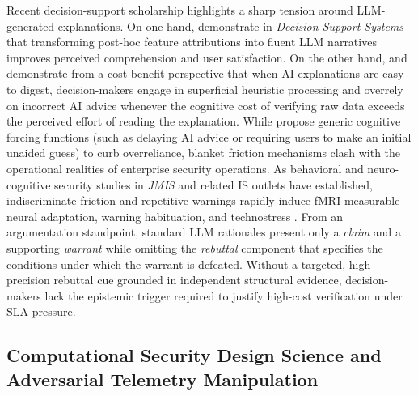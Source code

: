 \documentclass[11pt,a4paper]{article}
\begin{document}
Recent decision-support scholarship highlights a sharp tension around LLM-generated explanations. On one hand, \citet{bag2025enhancing} demonstrate in \textit{Decision Support Systems} that transforming post-hoc feature attributions into fluent LLM narratives improves perceived comprehension and user satisfaction. On the other hand, \citet{bucinca2021trust} and \citet{vasconcelos2023explanations} demonstrate from a cost-benefit perspective that when AI explanations are easy to digest, decision-makers engage in superficial heuristic processing and overrely on incorrect AI advice whenever the cognitive cost of verifying raw data exceeds the perceived effort of reading the explanation. While \citet{bucinca2021trust} propose generic cognitive forcing functions (such as delaying AI advice or requiring users to make an initial unaided guess) to curb overreliance, blanket friction mechanisms clash with the operational realities of enterprise security operations. As behavioral and neuro-cognitive security studies in \textit{JMIS} and related IS outlets have established, indiscriminate friction and repetitive warnings rapidly induce fMRI-measurable neural adaptation, warning habituation, and technostress \citep{anderson2016warning, vance2018fog, jensen2022improving, cram2021technostress, hsu2024proactive, tarafdar2017technostress}. From an argumentation standpoint, standard LLM rationales present only a \textit{claim} and a supporting \textit{warrant} while omitting the \textit{rebuttal} component that specifies the conditions under which the warrant is defeated. Without a targeted, high-precision rebuttal cue grounded in independent structural evidence, decision-makers lack the epistemic trigger required to justify high-cost verification under SLA pressure.

\subsection{Computational Security Design Science and Adversarial Telemetry Manipulation}
\label{subsec:lit_soc}
\end{document}
